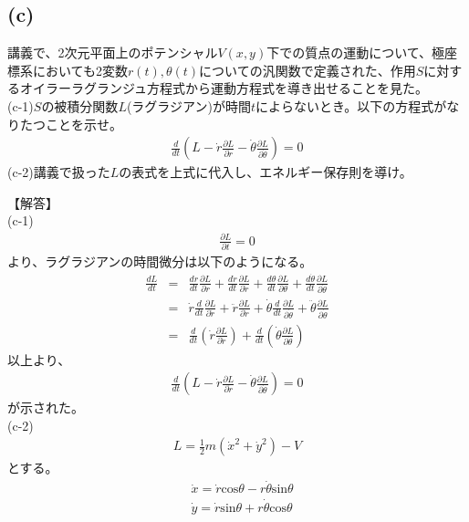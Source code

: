 \documentclass[pdflatex,ja=standard,fleqn]{bxjsarticle}
\begin{document}
\subsection*{(c)}
\begin{screen}
    講義で、2次元平面上のポテンシャル$V(x,y)$下での質点の運動について、極座標系においても2変数$r(t),\theta(t)$についての汎関数で定義された、作用$S$に対するオイラーラグランジュ方程式から運動方程式を導き出せることを見た。\\
    (c-1)$S$の被積分関数$L$(ラグラジアン)が時間$t$によらないとき。以下の方程式がなりたつことを示せ。
    \begin{eqnarray*}
        \frac{d}{dt} \left(L-\dot{r}\frac{\partial L}{\partial\dot{r}}-\dot{\theta}\frac{\partial L}{\partial\dot{\theta}}\right)=0
    \end{eqnarray*}
    (c-2)講義で扱った$L$の表式を上式に代入し、エネルギー保存則を導け。
\end{screen}
【解答】\\
(c-1)
\begin{eqnarray*}
    \frac{\partial L}{\partial t}=0
\end{eqnarray*}
より、ラグラジアンの時間微分は以下のようになる。
\begin{eqnarray*}
    \frac{dL}{dt}&=&\frac{dr}{dt}\frac{\partial L}{\partial r}+\frac{d\dot{r}}{dt}\frac{\partial L}{\partial\dot{r}}+\frac{d\theta}{dt}\frac{\partial L}{\partial\theta}+\frac{d\dot{\theta}}{dt}\frac{\partial L}{\partial\dot{\theta}}\\
    &=&\dot{r}\frac{d}{dt}\frac{\partial L}{\partial\dot{r}}+\ddot{r}\frac{\partial L}{\partial\dot{r}}+\dot{\theta}\frac{d}{dt}\frac{\partial L}{\partial\dot{\theta}}+\ddot{\theta}\frac{\partial L}{\partial\dot{\theta}}\\
    &=&\frac{d}{dt}\left(\dot{r}\frac{\partial L}{\partial\dot{r}}\right)+\frac{d}{dt}\left(\dot{\theta}\frac{\partial L}{\partial\dot{\theta}}\right)
\end{eqnarray*}
以上より、
\begin{eqnarray*}
    \frac{d}{dt} \left(L-\dot{r}\frac{\partial L}{\partial\dot{r}}-\dot{\theta}\frac{\partial L}{\partial\dot{\theta}}\right)=0
\end{eqnarray*}
が示された。\\
(c-2)\\
\begin{eqnarray*}
    L=\frac{1}{2}m(\dot{x}^2+\dot{y}^2)-V
\end{eqnarray*}
とする。
\begin{align*}
    &\dot{x}=\dot{r}\mathrm{cos}\theta-r\dot{\theta}\mathrm{sin}\theta\\
    &\dot{y}=\dot{r}\mathrm{sin}\theta+r\dot{\theta}\mathrm{cos}\theta
\end{align*}
\end{document}
